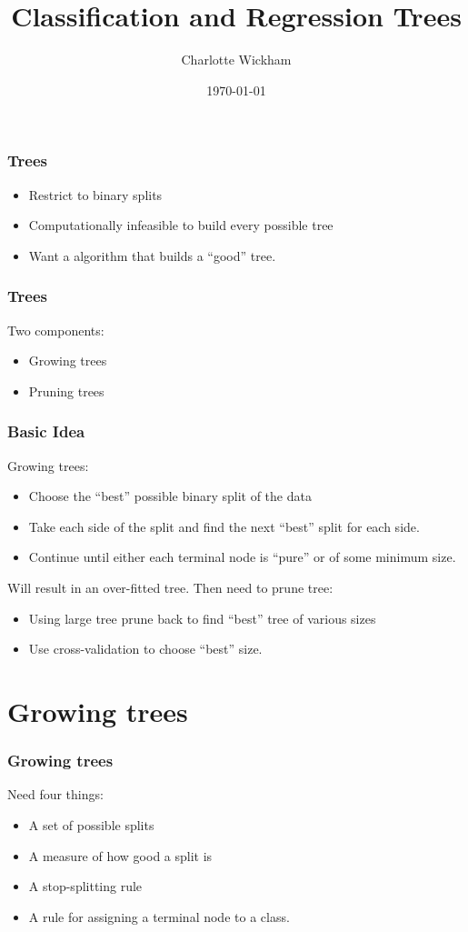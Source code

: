 \documentclass{beamer}
\title{Classification and Regression Trees}
\author{Charlotte Wickham}
\date{\today}
\begin{document}
\frame{\titlepage}

\section[Outline]{ 	}
\frame{\tableofcontents}


\begin{frame}
	\frametitle{Trees}
	\begin{itemize}
		\item Restrict to binary splits
		\item Computationally infeasible to build every possible tree
		\item Want a algorithm that builds a ``good'' tree.
	\end{itemize}
\end{frame}


\begin{frame}
	\frametitle{Trees}
	Two components:
	\begin{itemize}
		
		\item Growing trees
		\item Pruning trees
		
	\end{itemize}
\end{frame}

\begin{frame}
\frametitle{Basic Idea}
Growing trees:
\begin{itemize}
	\item Choose the ``best'' possible binary split of the data
	\item Take each side of the split and find the next ``best'' split for each side.
	\item Continue until either each terminal node is ``pure'' or of some minimum size.
\end{itemize}
Will result in an over-fitted tree. Then need to prune tree:
\begin{itemize}
	\item Using large tree prune back to find ``best'' tree of various sizes
	\item Use cross-validation to choose ``best'' size.
\end{itemize}
\end{frame}
\section{Growing trees}
\begin{frame}
	\frametitle{Growing trees}
	Need four things:
	\begin{itemize}
		\item A set of possible splits
		\item A measure of how good a split is
		\item A stop-splitting rule
		\item A rule for assigning a terminal node to a class. 
	\end{itemize}
\end{frame}
\end{document}
